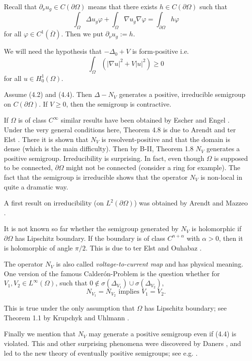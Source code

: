 Recall that $\partial_\nu u_g \in C(\partial\Omega)$ means that there exists $h \in C(\partial\Omega)$ such that
\[\int_\Omega \Delta u_g \varphi + \int_\Omega \nabla u_g \nabla\varphi = \int_{\partial\Omega} h\varphi\]
for all $\varphi \in C^1(\overline{\Omega})$. Then we put $\partial_\nu u_g := h$.

We will need the hypothesis that $-\Delta_0 + V$ is form-positive i.e.
\begin{equation} \tag{4.4}
\int_\Omega (|\nabla u|^2 + V|u|^2) \geq 0
\end{equation}
for all $u \in H^1_0(\Omega)$.

\begin{theorem}
Assume (4.2) and (4.4). Then $\Delta - N_{V}$ generates a positive, irreducible semigroup on $C(\partial\Omega)$. If $V \geq 0$, then the semigroup is contractive.
\end{theorem}

If $\Omega$ is of class $C^\infty$ similar results have been obtained by Escher \cite{Es94} and Engel \cite{En03}. 
Under the very general conditions here, Theorem 4.8 is due to Arendt and ter Elst \cite{AtE20}. There it is shown that $N_V$ is resolvent-positive and that the domain is dense (which is the main difficulty). 
Then by B-II, Theorem 1.8 $N_V$ generates a positive semigroup. 
Irreducibility is surprising. 
In fact, even though $\Omega$ is supposed to be connected, $\partial\Omega$ might not be connected (consider a ring for example). 
The fact that the semigroup is irreducible shows that the operator $N_V$ is non-local in quite a dramatic way.

A first result on irreducibility (on $L^2(\partial\Omega)$) was obtained by Arendt and Mazzeo \cite{AM12}.

It is not known so far whether the semigroup generated by $N_V$ is holomorphic if $\partial\Omega$ has Lipschitz boundary. If the boundary is of class $C^{n+\alpha}$ with $\alpha > 0$, then it is holomorphic of angle $\pi/2$. This is due to ter Elst and Ouhabaz \cite{tEO19}.

The operator $N_V$ is also called \emph{voltage-to-current map} and has physical meaning. 
One version of the famous Calderón-Problem is the question whether for $V_1, V_2 \in L^\infty(\Omega)$, such that $0 \notin \sigma(\Delta_{V_1}) \cup \sigma(\Delta_{V_2})$,
\[N_{V_1} = N_{V_2} \text{ implies } V_1 = V_2.\]

This is true under the only assumption that $\Omega$ has Lipschitz boundary; see Theorem 1.1 by Krupchyk and Uhlmann \cite{KU14}.

Finally we mention that $N_V$ may generate a positive semigroup even if (4.4) is violated. This and other surprising phenomena were discovered by Daners \cite{Da14}, and led to the new theory of eventually positive semigroups; see e.g. \cite{DEK16}.





{\RaggedRight


}

